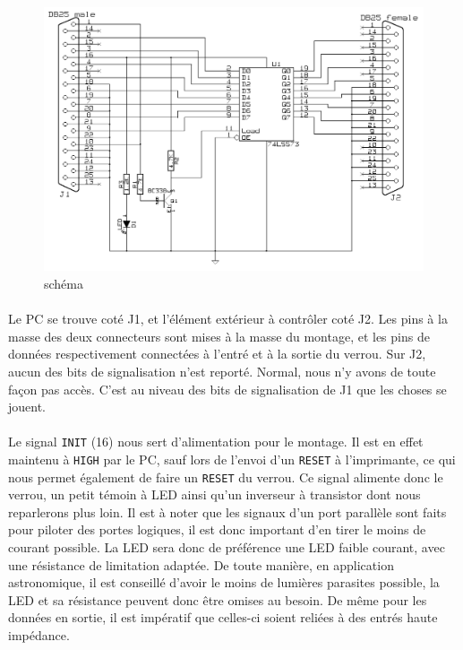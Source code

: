 \documentclass[11pt,a4paper]{book}
\begin{document}
 \begin{figure}
 \center
 \includegraphics[scale=1.1]{./medias/latch1.png}
 \caption{sch\'ema}
 \label{latch1}
 \end{figure}
 
\paragraph*{}
Le PC se trouve cot\'e J1, et l'\'el\'ement ext\'erieur \`a contr\^oler cot\'e J2. Les pins \`a
la masse des deux connecteurs sont mises \`a la masse du montage, et les pins de donn\'ees 
respectivement connect\'ees \`a l'entr\'e et \`a la sortie du verrou. Sur J2, aucun des bits
de signalisation n'est report\'e. Normal, nous n'y avons de toute fa\c{c}on pas acc\`es.
C'est au niveau des bits de signalisation de J1 que les choses se jouent.

\paragraph*{}
Le signal {\tt INIT} (16) nous sert d'alimentation pour le montage. Il est en effet maintenu \`a
{\tt HIGH} par le PC, sauf lors de l'envoi d'un {\tt RESET} \`a l'imprimante, ce qui nous permet 
\'egalement de faire un {\tt RESET} du verrou. Ce signal alimente donc le verrou, un petit t\'emoin
\`a LED ainsi qu'un inverseur \`a transistor dont nous reparlerons plus loin. Il est \`a noter
que les signaux d'un port parall\`ele sont faits pour piloter des portes logiques, il est donc 
important d'en tirer le moins de courant possible. La LED sera donc de pr\'ef\'erence une LED
faible courant, avec une r\'esistance de limitation adapt\'ee. De toute mani\`ere, en application
astronomique, il est conseill\'e d'avoir le moins de lumi\`eres parasites possible, la LED et sa r\'esistance 
peuvent donc \^etre omises au besoin. De m\^eme pour les donn\'ees en sortie, il est imp\'eratif que 
celles-ci soient reli\'ees \`a des entr\'es haute imp\'edance.
\end{document}
